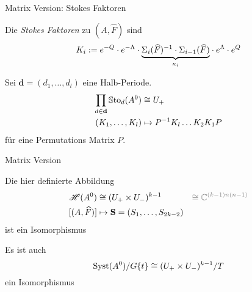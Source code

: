 \begin{frame}[t]{Matrix Version: Stokes Faktoren}
  \begin{defn}
    Die \emph{Stokes Faktoren} zu $(A,\hat F)$ sind
    \[
      K_i:= e^{-Q}\cdot e^{-\Lambda} \cdot
        \underset{\kappa_i}{\underbrace{%
        \Sigma_i(\hat F)^{-1}\cdot \Sigma_{i-1}(\hat F)}}
      \cdot  e^{\Lambda}\cdot e^{Q}
    \]
  \end{defn}
\end{frame}
\begin{frame}[t,fragile]
  \begin{lem}
    Sei $\textbf{d}=(d_1,\dots,d_l)$ eine Halb-Periode.
    \begin{align*}
      \prod_{d\in\textbf{d}}\operatorname{\mathbb{S}to}_d(A^0) &\cong U_+\\
      (K_1,\dots,K_l) &\mapsto P^{-1}K_l\dots K_2K_1P
    \end{align*}
    für eine Permutations Matrix $P$.
  \end{lem}
\end{frame}
\begin{frame}{Matrix Version}
  \begin{tthm}
    Die hier definierte Abbildung
    \begin{align*}
      \sH(A^0)&\cong(U_+\times U_-)^{k-1}
      &\textcolor{gray}{\cong\C^{(k-1)n(n-1)}}
    \\ [(A,\hat F)]&\mapsto\textbf{S}=(S_1,\dots,S_{2k-2})
    \end{align*}
    ist ein Isomorphismus
    \begin{cor}
      Es ist auch 
      \[
        \operatorname{Syst}(A^0)/G\{t\}\cong(U_+\times U_-)^{k-1}/T
      \]
      ein Isomorphismus
    \end{cor}
  \end{tthm}
\end{frame}
